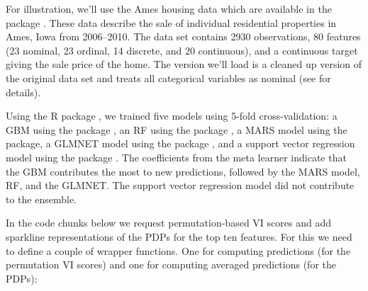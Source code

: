 For illustration, we'll use the Ames housing data which are available in the  package \citep{AmesHousing-pkg}. These data describe the sale of individual residential properties in Ames, Iowa from 2006--2010. The data set contains 2930 observations, 80 features (23 nominal, 23 ordinal, 14 discrete, and 20 continuous), and a continuous target giving the sale price of the home. The version we'll load is a cleaned up version of the original data set and treats all categorical variables as nominal (see  for details).

Using the R package  \citep{SuperLearner-pkg}, we trained five models using 5-fold cross-validation: a GBM using the  package \citep{xgboost-pkg}, an RF using the  package \citep{ranger-pkg}, a MARS model using the  package, a GLMNET model using the  package \citep{glmnet-pkg}, and a support vector regression model using the  package \citep{kernlab-pkg}. The coefficients from the meta learner indicate that the GBM contributes the most to new predictions, followed by the MARS model, RF, and the GLMNET. The support vector regression model did not contribute to the ensemble.


In the code chunks below we request permutation-based VI scores and add sparkline representations of the PDPs for the top ten features. For this we need to define a couple of wrapper functions. One for computing predictions (for the permutation VI scores) and one for computing averaged predictions (for the PDPs):


